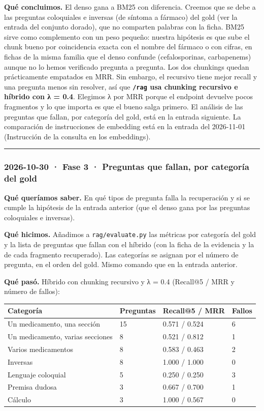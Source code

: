 \textbf{Qué concluimos.} El denso gana a BM25 con diferencia. Creemos que se debe a las preguntas
coloquiales e inversas (de síntoma a fármaco) del gold (ver la entrada del conjunto dorado), que
no comparten palabras con la ficha. BM25 sirve como complemento con un
peso pequeño: nuestra hipótesis es que sube el chunk bueno por coincidencia exacta con el nombre
del fármaco o con cifras, en fichas de la misma familia que el denso confunde (cefalosporinas,
carbapenems) aunque no lo hemos verificado pregunta a pregunta. Los dos chunkings quedan prácticamente
empatados en MRR. Sin embargo, el recursivo tiene mejor recall y una pregunta menos sin resolver, así que
\textbf{\texttt{/\allowbreak{}rag} usa chunking recursivo e híbrido con λ = 0.4}. Elegimos λ por MRR porque el endpoint
devuelve pocos fragmentos y lo que importa es que el bueno salga primero. El análisis de las preguntas que
fallan, por categoría del gold, está en la entrada siguiente. La comparación de instrucciones
de embedding está en la entrada del 2026-11-01 (Instrucción de la consulta en los embeddings).

\begin{center}\rule{0.5\linewidth}{0.5pt}\end{center}

\subsubsection{2026-10-30 · Fase 3 · Preguntas que fallan, por categoría del gold}

\textbf{Qué queríamos saber.} En qué tipos de pregunta falla la recuperación y si se cumple la
hipótesis de la entrada anterior (que el denso gana por las preguntas coloquiales e inversas).

\textbf{Qué hicimos.} Añadimos a \texttt{rag/\allowbreak{}evaluate.py} las métricas por categoría del gold y la lista de
preguntas que fallan con el híbrido (con la ficha de la evidencia y la de cada fragmento
recuperado). Las categorías se asignan por el número de pregunta, en el orden del gold. Mismo
comando que en la entrada anterior.

\textbf{Qué pasó.} Híbrido con chunking recursivo y λ = 0.4 (Recall@5 / MRR y número de fallos):

{\def\LTcaptype{none} %
\small\setlength{\tabcolsep}{3pt}
\begin{longtable}[]{@{}llll@{}}
\toprule\noalign{}
Categoría & Preguntas & Recall@5 / MRR & Fallos \\
\midrule\noalign{}
\endhead
\bottomrule\noalign{}
\endlastfoot
Un medicamento, una sección & 15 & 0.571 / 0.524 & 6 \\
Un medicamento, varias secciones & 8 & 0.521 / 0.812 & 1 \\
Varios medicamentos & 8 & 0.583 / 0.463 & 2 \\
Inversas & 8 & 1.000 / 1.000 & 0 \\
Lenguaje coloquial & 5 & 0.250 / 0.250 & 3 \\
Premisa dudosa & 3 & 0.667 / 0.700 & 1 \\
Cálculo & 3 & 1.000 / 0.567 & 0 \\
\end{longtable}
}

